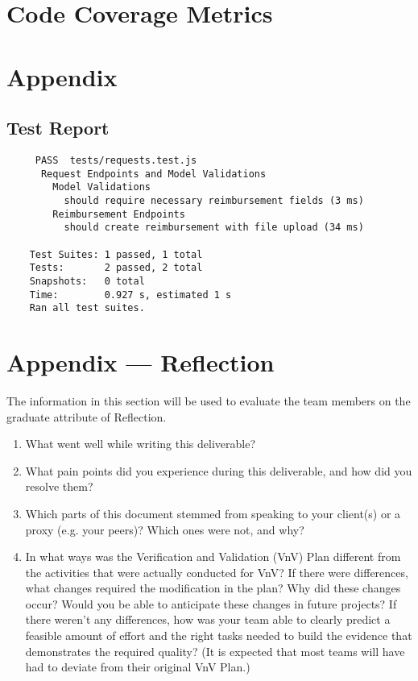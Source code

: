 \documentclass[12pt, titlepage]{article}
\begin{document}
\section{Code Coverage Metrics}

\section{Appendix}
\subsection{Test Report} \label{test_report}
\begin{small} 
  \begin{verbatim} 
     PASS  tests/requests.test.js
      Request Endpoints and Model Validations
        Model Validations
          should require necessary reimbursement fields (3 ms)
        Reimbursement Endpoints
          should create reimbursement with file upload (34 ms)

    Test Suites: 1 passed, 1 total
    Tests:       2 passed, 2 total
    Snapshots:   0 total
    Time:        0.927 s, estimated 1 s
    Ran all test suites.
  \end{verbatim}
\end{small}




\newpage{}
\section*{Appendix --- Reflection}

The information in this section will be used to evaluate the team members on the
graduate attribute of Reflection.



\begin{enumerate}
  \item What went well while writing this deliverable? 
  \item What pain points did you experience during this deliverable, and how
    did you resolve them?
  \item Which parts of this document stemmed from speaking to your client(s) or
  a proxy (e.g. your peers)? Which ones were not, and why?
  \item In what ways was the Verification and Validation (VnV) Plan different
  from the activities that were actually conducted for VnV?  If there were
  differences, what changes required the modification in the plan?  Why did
  these changes occur?  Would you be able to anticipate these changes in future
  projects?  If there weren't any differences, how was your team able to clearly
  predict a feasible amount of effort and the right tasks needed to build the
  evidence that demonstrates the required quality?  (It is expected that most
  teams will have had to deviate from their original VnV Plan.)
\end{enumerate}
\end{document}
